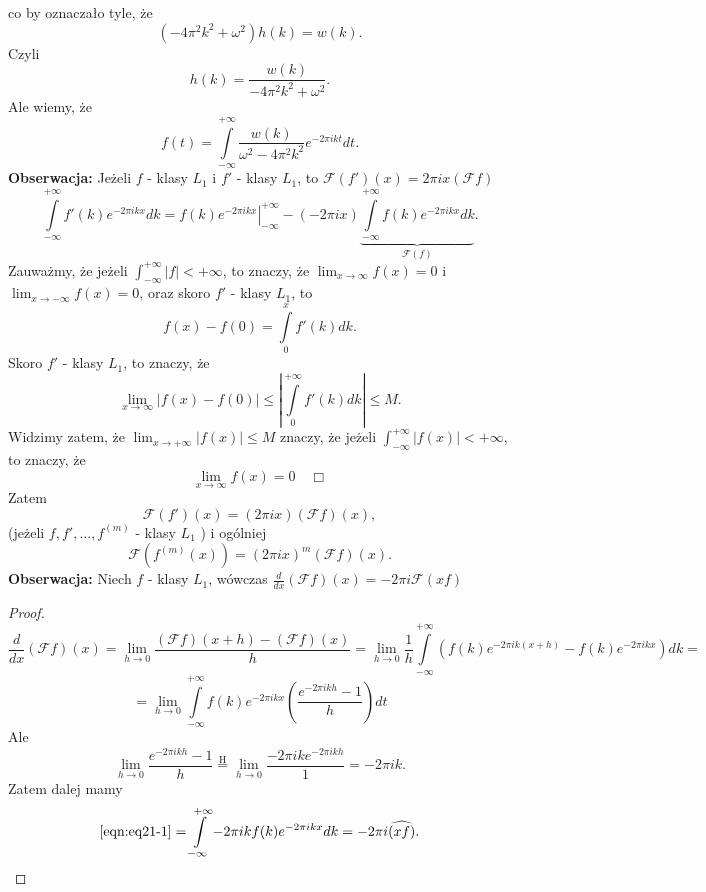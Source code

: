\documentclass[../main.tex]{subfiles}
\begin{document}
co by oznaczało tyle, że
\[
    \left(-4 \pi^2 k^2 + \omega^2\right)h(k) = w(k)
.\]
Czyli
\[
    h(k) = \frac{w(k)}{-4\pi^2 k^2 + \omega^2}
.\]
Ale wiemy, że
\[
    f(t) = \int\limits_{-\infty}^{+\infty}\frac{w(k)}{\omega^2 - 4 \pi^2 k^2}e^{-2\pi i kt}dt
.\]
\textbf{Obserwacja: }Jeżeli $f$ - klasy $L_1$ i $f'$ - klasy $L_1$, to $\mathcal{F}\left(f'\right)(x) = 2\pi i x (\mathcal{F}f)$
\[
    \int\limits_{-\infty}^{+\infty}f'(k)e^{-2\pi i kx}dk = \left. f(k)e^{-2 \pi i kx} \right|_{-\infty}^{+\infty} - \left( -2\pi i x \right) \underbrace{\int\limits_{-\infty}^{+\infty}f(k)e^{-2\pi i kx}dk}_{\mathcal{F}(f)}
.\]
Zauważmy, że jeżeli $\int_{-\infty}^{+\infty}|f| < +\infty$, to znaczy, że $\lim_{x \to \infty}f(x) = 0$ i $\lim_{x \to -\infty}f(x) = 0$, oraz skoro $f'$ - klasy $L_1$, to
\[
    f(x) - f(0) = \int\limits_{0}^x f'(k)dk
.\]
Skoro $f'$ - klasy $L_1$, to znaczy, że
\[
    \lim_{x \to \infty}\left| f(x) - f(0) \right| \le \left| \int\limits_{0}^{+\infty}f'(k)dk \right| \le M
.\]
Widzimy zatem, że $\lim_{x \to +\infty}\left| f(x) \right| \le M$ znaczy, że jeżeli $\int_{-\infty}^{+\infty}|f(x)| < +\infty$, to znaczy, że
\[\lim_{x \to \infty}f(x) = 0\quad \Box\]
Zatem
\[
    \mathcal{F}\left( f' \right) (x) = (2\pi i x)(\mathcal{F}f)(x)
,\]
(jeżeli $f,f',\ldots,f^{(m)}$ - klasy $L_1$ ) i ogólniej
\[
    \mathcal{F}(f^{(m)}(x)) = \left( 2\pi i x \right) ^m (\mathcal{F}f)(x)
.\]
\textbf{Obserwacja: }Niech $f$ - klasy $L_1$, wówczas $\frac{d}{dx} \left( \mathcal{F}f \right) (x) = -2\pi i \mathcal{F}(xf)$
\begin{proof}
    \[
        \frac{d}{dx}\left( \mathcal{F}f \right) (x) = \lim_{h \to 0}\frac{(\mathcal{F}f)(x+h) - (\mathcal{F}f)(x)}{h} = \lim_{h \to 0}\frac{1}{h}\int\limits_{-\infty}^{+\infty}\left( f(k)e^{-2\pi i k(x+h)} - f(k)e^{-2\pi i kx} \right)dk =
    \]
    \begin{equation}
        \label{eqn:eq21-1}
        = \lim_{h \to 0}\int\limits_{-\infty}^{+\infty}f(k)e^{-2\pi i k x}\left( \frac{e^{-2\pi i k h} - 1}{h} \right) dt\tag{$\star$}
    \end{equation}
Ale
\[
    \lim_{h \to 0}\frac{e^{-2\pi i k h} - 1}{h} \overset{\text{H}}{=} \lim_{h \to 0} \frac{-2\pi i ke^{-2\pi i kh}}{1} = -2\pi i k
.\]
Zatem dalej mamy
\[
    \eqref{eqn:eq21-1} = \int\limits_{-\infty}^{+\infty}-2\pi i k f(k)e^{-2\pi i kx}dk = -2\pi i \widehat{\left( xf \right) }
.\]
\end{proof}
\end{document}
